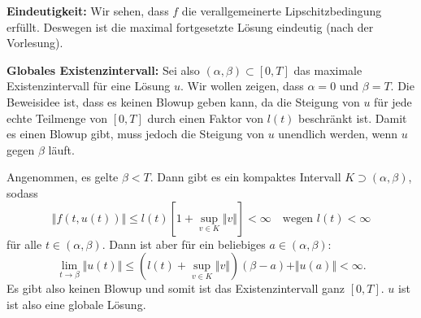 \documentclass[a4paper]{article}
\theoremstyle{plain}
\begin{document}
\textbf{Eindeutigkeit:} Wir sehen, dass $f$ die verallgemeinerte Lipschitzbedingung erfüllt. Deswegen ist die maximal fortgesetzte Lösung eindeutig (nach der Vorlesung).

\textbf{Globales Existenzintervall:} Sei also $(\alpha, \beta) \subset [0,T]$ das maximale Existenzintervall für eine Lösung $u$. Wir wollen zeigen, dass $\alpha = 0$ und $\beta = T$. Die Beweisidee ist, dass es keinen Blowup geben kann, da die Steigung von $u$ für jede echte Teilmenge von $[0,T]$ durch einen Faktor von $l(t)$ beschränkt ist. Damit es einen Blowup gibt, muss jedoch die Steigung von $u$ unendlich werden, wenn $u$ gegen $\beta$ läuft.

 Angenommen, es gelte $\beta<T$. Dann gibt es ein kompaktes Intervall $K \supset (\alpha,\beta)$, sodass $$\Vert f(t,u(t)) \Vert \leq l(t) [1+ \sup\limits_{v \in K} \Vert v \Vert] < \infty \quad \text{wegen $l(t) < \infty$}$$ für alle $t \in (\alpha, \beta)$. Dann ist aber für ein beliebiges $a \in (\alpha, \beta)$: $$\lim_{t \to \beta} \Vert u(t) \Vert \leq (l(t) + \sup\limits_{v \in K} \Vert v \Vert) (\beta - a) + \Vert u(a)\Vert < \infty.$$ Es gibt also keinen Blowup und somit ist das Existenzintervall ganz $[0,T]$. $u$ ist ist also eine globale Lösung.
\end{document}
